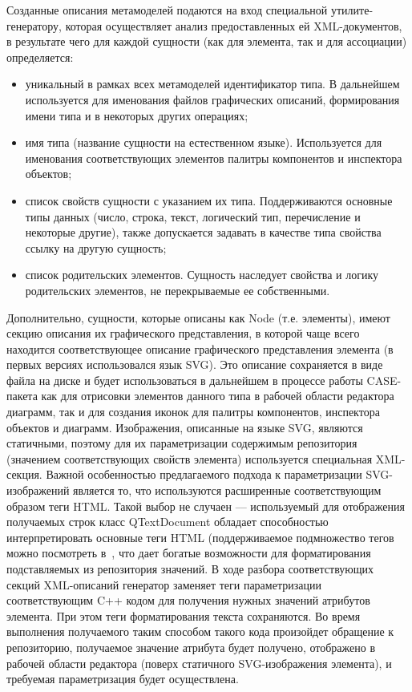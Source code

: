 \documentclass[a5paper]{article}
\begin{document}
Созданные описания метамоделей подаются на вход специальной
утилите-генератору, которая осуществляет анализ предоставленных ей
XML-документов, в результате чего для
каждой сущности (как для элемента, так и для ассоциации) определяется:

\begin{itemize}
  \item уникальный в рамках всех метамоделей идентификатор типа. В дальнейшем
	используется для именования файлов графических описаний, формирования
	имени типа и в некоторых других операциях;
  \item имя типа (название сущности на естественном языке). Используется для
	именования соответствующих элементов палитры компонентов и инспектора
	объектов;
  \item список свойств сущности с указанием их типа. Поддерживаются основные
	типы данных (число, строка, текст, логический тип, перечисление и
	некоторые другие), также допускается задавать в качестве типа свойства
	ссылку на другую сущность;
  \item список родительских элементов. Сущность наследует свойства и логику
	родительских элементов, не перекрываемые ее собственными.
\end{itemize}

Дополнительно, сущности, которые описаны как
Node (т.е. элементы), имеют секцию описания
их графического представления, в которой чаще всего находится
соответствующее описание графического представления элемента (в первых
версиях использовался язык SVG). Это
описание сохраняется в виде файла на диске и будет использоваться в
дальнейшем в процессе работы CASE-пакета
как для отрисовки элементов данного типа в рабочей области редактора
диаграмм, так и для создания иконок для палитры компонентов, инспектора
объектов и диаграмм. Изображения, описанные на языке SVG, являются статичными, поэтому для их
параметризации содержимым репозитория (значением соответствующих
свойств элемента) используется специальная
XML-секция. Важной особенностью предлагаемого подхода к параметризации
SVG-изображений является то, что используются расширенные соответствующим образом теги
HTML. Такой выбор не случаен –-- используемый
для отображения получаемых строк класс QTextDocument обладает способностью
интерпретировать основные теги HTML
(поддерживаемое подмножество тегов можно посмотреть в~\cite{htmlInQt}, что дает
богатые возможности для форматирования подставляемых из репозитория
значений. В ходе разбора соответствующих секций XML-описаний генератор заменяет теги
параметризации соответствующим C++ кодом для
получения нужных значений атрибутов элемента. При этом теги
форматирования текста сохраняются. Во время выполнения получаемого
таким способом такого кода произойдет обращение к репозиторию,
получаемое значение атрибута будет получено, отображено в рабочей
области редактора (поверх статичного SVG-изображения элемента), и требуемая
параметризация будет осуществлена.
\end{document}
